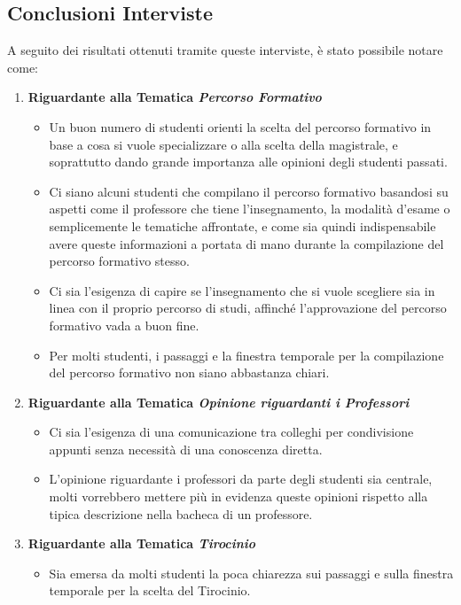 \subsection{Conclusioni Interviste}
A seguito dei risultati ottenuti tramite queste interviste, è stato possibile notare come:
\begin{enumerate}
    \item \textbf{Riguardante alla Tematica \textit{Percorso Formativo}}
    \begin{itemize}
        \item Un buon numero di studenti orienti la scelta del percorso formativo in base 
        a cosa si vuole specializzare o alla scelta della magistrale, e soprattutto dando grande importanza alle opinioni degli studenti passati.
        \item Ci siano alcuni studenti che compilano il percorso formativo basandosi su aspetti come il professore che tiene l'insegnamento, la modalità d'esame o semplicemente le tematiche affrontate,
        e come sia quindi indispensabile avere queste informazioni a portata di mano durante la compilazione del percorso formativo stesso.
        \item Ci sia l'esigenza di capire se l'insegnamento che si vuole scegliere sia in linea con il proprio percorso di studi, affinché l'approvazione del percorso formativo vada a buon fine.
        \item Per molti studenti, i passaggi e la finestra temporale per la compilazione del percorso formativo non siano abbastanza chiari.
    \end{itemize}
    \item \textbf{Riguardante alla Tematica \textit{Opinione riguardanti i Professori}}
    \begin{itemize}
        \item Ci sia l'esigenza di una comunicazione tra colleghi per condivisione appunti senza necessità di una conoscenza diretta.
        \item L'opinione riguardante i professori da parte degli studenti sia centrale, molti vorrebbero mettere più
        in evidenza queste opinioni rispetto alla tipica descrizione nella bacheca di un professore.
    \end{itemize}
    \item \textbf{Riguardante alla Tematica \textit{Tirocinio}}
    \begin{itemize}
        \item Sia emersa da molti studenti la poca chiarezza sui passaggi e sulla finestra temporale per la scelta del Tirocinio.

\end{itemize}
\end{enumerate}
